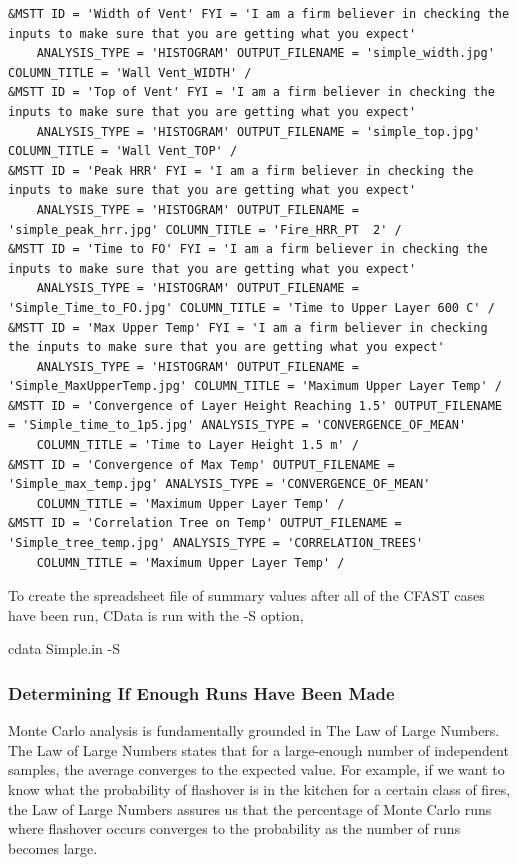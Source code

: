 \documentclass[12pt,twoside]{book}
\begin{document}
\begin{lstlisting}[basicstyle=\tiny]
&MSTT ID = 'Width of Vent' FYI = 'I am a firm believer in checking the inputs to make sure that you are getting what you expect'
    ANALYSIS_TYPE = 'HISTOGRAM' OUTPUT_FILENAME = 'simple_width.jpg' COLUMN_TITLE = 'Wall Vent_WIDTH' /
&MSTT ID = 'Top of Vent' FYI = 'I am a firm believer in checking the inputs to make sure that you are getting what you expect'
    ANALYSIS_TYPE = 'HISTOGRAM' OUTPUT_FILENAME = 'simple_top.jpg' COLUMN_TITLE = 'Wall Vent_TOP' /
&MSTT ID = 'Peak HRR' FYI = 'I am a firm believer in checking the inputs to make sure that you are getting what you expect'
    ANALYSIS_TYPE = 'HISTOGRAM' OUTPUT_FILENAME = 'simple_peak_hrr.jpg' COLUMN_TITLE = 'Fire_HRR_PT  2' /
&MSTT ID = 'Time to FO' FYI = 'I am a firm believer in checking the inputs to make sure that you are getting what you expect'
    ANALYSIS_TYPE = 'HISTOGRAM' OUTPUT_FILENAME = 'Simple_Time_to_FO.jpg' COLUMN_TITLE = 'Time to Upper Layer 600 C' /
&MSTT ID = 'Max Upper Temp' FYI = 'I am a firm believer in checking the inputs to make sure that you are getting what you expect'
    ANALYSIS_TYPE = 'HISTOGRAM' OUTPUT_FILENAME = 'Simple_MaxUpperTemp.jpg' COLUMN_TITLE = 'Maximum Upper Layer Temp' /
&MSTT ID = 'Convergence of Layer Height Reaching 1.5' OUTPUT_FILENAME = 'Simple_time_to_1p5.jpg' ANALYSIS_TYPE = 'CONVERGENCE_OF_MEAN'
    COLUMN_TITLE = 'Time to Layer Height 1.5 m' /
&MSTT ID = 'Convergence of Max Temp' OUTPUT_FILENAME = 'Simple_max_temp.jpg' ANALYSIS_TYPE = 'CONVERGENCE_OF_MEAN'
    COLUMN_TITLE = 'Maximum Upper Layer Temp' /
&MSTT ID = 'Correlation Tree on Temp' OUTPUT_FILENAME = 'Simple_tree_temp.jpg' ANALYSIS_TYPE = 'CORRELATION_TREES'
    COLUMN_TITLE = 'Maximum Upper Layer Temp' /
\end{lstlisting}

To create the spreadsheet file of summary values after all of the CFAST cases have been run, CData is run with the {\ct -S} option,

\vspace{\baselineskip}
{\ct cdata Simple.in -S}

\subsubsection{Determining If Enough Runs Have Been Made}

Monte Carlo analysis is fundamentally grounded in The Law of Large Numbers. The Law of Large Numbers states that for a large-enough number of independent samples, the average converges to the expected value. For example, if we want to know what the probability of flashover is in the kitchen for a certain class of fires, the Law of Large Numbers assures us that the percentage of Monte Carlo runs where flashover occurs converges to the probability as the number of runs becomes large.
\end{document}
